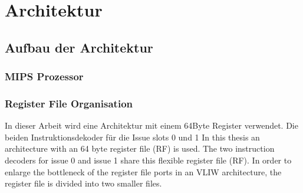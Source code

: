 \chapter{Architektur}
\label{chap:architecture}

\section{Aufbau der Architektur}
\label{chap:architecture_overview}

\subsection{MIPS Prozessor}
\subsection{Register File Organisation}
In dieser Arbeit wird eine Architektur mit einem 64Byte Register verwendet. Die beiden Instruktionsdekoder für die Issue slots 0 und 1
In this thesis an architecture  with an 64 byte register file (RF) is used.
The two instruction decoders for issue 0 and issue 1 share this flexible register file (RF). In order to enlarge the bottleneck of the register file ports in an VLIW architecture, the register file is divided into two smaller files.
